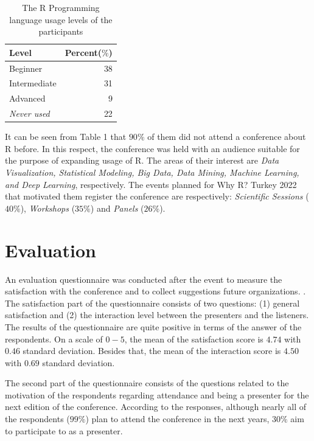 \begin{table}[H]
    \centering
    \begin{tabular}{lr} \\\hline
        Level        & Percent($\%$) \\\hline
        Beginner     & 38\\
        Intermediate & 31\\
        Advanced     & 9\\
        \textit{Never used}   & 22\\\hline
    \end{tabular}
    \caption{The R Programming language usage levels of the participants}
    \label{tab:my_label}
\end{table}

\noindent It can be seen from Table 1 that $90\%$ of them did not attend a conference about R before. In this respect, the conference was held with an audience suitable for the purpose of expanding usage of R.  The areas of their interest are \textit{Data Visualization, Statistical Modeling, Big Data, Data Mining, Machine Learning, and Deep Learning}, respectively. The events planned for Why R? Turkey 2022 that motivated them register the conference are respectively: \textit{Scientific Sessions} ($40\%$), \textit{Workshops} ($35\%$) and \textit{Panels} ($26\%$).\\

\section{Evaluation}

An evaluation questionnaire was conducted after the event to measure the satisfaction with the conference and to collect suggestions future organizations. \citep{cordoba2019}. The satisfaction part of the questionnaire consists of two questions: (1) general satisfaction and (2) the interaction level between the presenters and the listeners. The results of the questionnaire are quite positive in terms of the answer of the respondents. On a scale of $0-5$, the mean of the satisfaction score is $4.74$ with $0.46$ standard deviation. Besides that, the mean of the interaction score is $4.50$ with $0.69$ standard deviation.

The second part of the questionnaire consists of the questions related to the motivation of the respondents regarding attendance and being a presenter for the next edition of the conference. According to the responses, although nearly all of the respondents ($99\%$) plan to attend the conference in the next years, $30\%$ aim to participate to as a presenter. 

